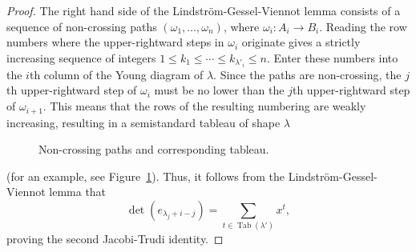 \documentclass[11pt]{amsproc}
\theoremstyle{definition}
\theoremstyle{example}
\DeclareMathOperator{\tab}{Tab}
\begin{document}
\begin{proof}
  The right hand side of the Lindstr\"om-Gessel-Viennot lemma consists of a sequence of non-crossing paths $(\omega_1,\dotsc,\omega_n)$, where $\omega_i:A_i\to B_i$.
  Reading the row numbers where the upper-rightward steps in $\omega_i$ originate gives a strictly increasing sequence of integers $1\leq k_1 \leq \dotsb \leq k_{\lambda'_i}\leq n$.
  Enter these numbers into the $i$th column of the Young diagram of $\lambda$.
  Since the paths are non-crossing, the $j$th upper-rightward step of $\omega_i$ must be no lower than the $j$th upper-rightward step of $\omega_{i+1}$.
  This means that the rows of the resulting numbering are weakly increasing, resulting in a semistandard tableau of shape $\lambda$
  \begin{figure}
    \centering
    \hspace{1cm}
    \caption{Non-crossing paths and corresponding tableau.}
    \label{fig:jte}
  \end{figure}
  (for an example, see Figure~\ref{fig:jte}).
  Thus, it follows from the Lindstr\"om-Gessel-Viennot lemma that
  \begin{displaymath}
    \det(e_{\lambda_j+i-j}) = \sum_{t\in \tab(\lambda')} x^t,
  \end{displaymath}
  proving the second Jacobi-Trudi identity.
\end{proof}
\end{document}
